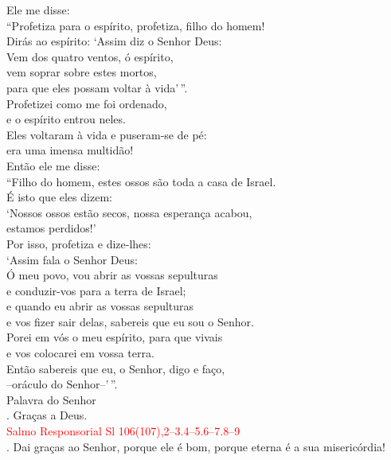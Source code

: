 \documentclass{book}
\begin{document}
\begin{flushleft}
    Ele me disse: \\
    ``Profetiza para o espírito, profetiza, filho do homem! \\
    Dirás ao espírito: `Assim diz o Senhor Deus: \\
    Vem dos quatro ventos, ó espírito, \\
    vem soprar sobre estes mortos, \\
    para que eles possam voltar à vida'\,''. \\
    Profetizei como me foi ordenado, \\
    e o espírito entrou neles. \\
    Eles voltaram à vida e puseram-se de pé: \\
    era uma imensa multidão! \\
    Então ele me disse: \\
    ``Filho do homem, estes ossos são toda a casa de Israel. \\
    É isto que eles dizem: \\
    `Nossos ossos estão secos, nossa esperança acabou, \\
    estamos perdidos!' \\
    Por isso, profetiza e dize-lhes: \\
    `Assim fala o Senhor Deus: \\
    Ó meu povo, vou abrir as vossas sepulturas \\
    e conduzir-vos para a terra de Israel; \\
    e quando eu abrir as vossas sepulturas \\
    e vos fizer sair delas, sabereis que eu sou o Senhor. \\
    Porei em vós o meu espírito, para que vivais \\
    e vos colocarei em vossa terra. \\
    Então sabereis que eu, o Senhor, digo e faço, \\
    --oráculo do Senhor--'\,''.
    \vspace{.1cm} \\
    Palavra do Senhor \\
    {\color{red} \Rbar.} Graças a Deus.
    \vspace{.2cm} \\
    \textcolor{red}{Salmo Responsorial
        \hspace{\fill} Sl 106(107),2--3.4--5.6--7.8--9}
    \vspace{.1cm} \\
    {\color{red} \Rbar.} Dai graças ao Senhor, porque ele é bom, porque eterna é a sua misericórdia!

\end{flushleft}
\end{document}
